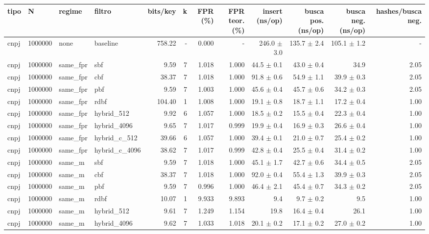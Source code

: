 \begin{tabular}{llllrrrrrrrr}
\toprule
tipo & N & regime & filtro & bits/key & k & FPR (\%) & FPR teor. (\%) & insert (ns/op) & busca pos. (ns/op) & busca neg. (ns/op) & hashes/busca neg. \\
\midrule
cnpj & 1000000 & none & baseline & 758.22 & - & 0.000 & - & 246.0 $\pm$ 3.0 & 135.7 $\pm$ 2.4 & 105.1 $\pm$ 1.2 & - \\
cnpj & 1000000 & same\_fpr & sbf & 9.59 & 7 & 1.018 & 1.000 & 44.5 $\pm$ 0.1 & 43.0 $\pm$ 0.4 & 34.9 & 2.05 \\
cnpj & 1000000 & same\_fpr & cbf & 38.37 & 7 & 1.018 & 1.000 & 91.8 $\pm$ 0.6 & 54.9 $\pm$ 1.1 & 39.9 $\pm$ 0.3 & 2.05 \\
cnpj & 1000000 & same\_fpr & pbf & 9.59 & 7 & 1.003 & 1.000 & 45.6 $\pm$ 0.4 & 45.7 $\pm$ 0.6 & 34.2 $\pm$ 0.3 & 2.05 \\
cnpj & 1000000 & same\_fpr & rdbf & 104.40 & 1 & 1.008 & 1.000 & 19.1 $\pm$ 0.8 & 18.7 $\pm$ 1.1 & 17.2 $\pm$ 0.4 & 1.00 \\
cnpj & 1000000 & same\_fpr & hybrid\_512 & 9.92 & 6 & 1.057 & 1.000 & 18.5 $\pm$ 0.2 & 15.5 $\pm$ 0.4 & 22.3 $\pm$ 0.4 & 1.00 \\
cnpj & 1000000 & same\_fpr & hybrid\_4096 & 9.65 & 7 & 1.017 & 0.999 & 19.9 $\pm$ 0.4 & 16.9 $\pm$ 0.3 & 26.6 $\pm$ 0.4 & 1.00 \\
cnpj & 1000000 & same\_fpr & hybrid\_c\_512 & 39.66 & 6 & 1.057 & 1.000 & 39.4 $\pm$ 0.1 & 21.0 $\pm$ 0.7 & 25.4 $\pm$ 0.2 & 1.00 \\
cnpj & 1000000 & same\_fpr & hybrid\_c\_4096 & 38.62 & 7 & 1.017 & 0.999 & 42.8 $\pm$ 0.4 & 25.5 $\pm$ 0.4 & 31.4 $\pm$ 0.2 & 1.00 \\
cnpj & 1000000 & same\_m & sbf & 9.59 & 7 & 1.018 & 1.000 & 45.1 $\pm$ 1.7 & 42.7 $\pm$ 0.6 & 34.4 $\pm$ 0.5 & 2.05 \\
cnpj & 1000000 & same\_m & cbf & 38.37 & 7 & 1.018 & 1.000 & 92.0 $\pm$ 0.4 & 55.4 $\pm$ 1.3 & 39.9 $\pm$ 0.3 & 2.05 \\
cnpj & 1000000 & same\_m & pbf & 9.59 & 7 & 0.996 & 1.000 & 46.4 $\pm$ 2.1 & 45.4 $\pm$ 0.7 & 34.3 $\pm$ 0.2 & 2.05 \\
cnpj & 1000000 & same\_m & rdbf & 10.07 & 1 & 9.933 & 9.893 & 9.4 & 9.7 $\pm$ 0.2 & 9.5 & 1.00 \\
cnpj & 1000000 & same\_m & hybrid\_512 & 9.61 & 7 & 1.249 & 1.154 & 19.8 & 16.4 $\pm$ 0.4 & 26.1 & 1.00 \\
cnpj & 1000000 & same\_m & hybrid\_4096 & 9.62 & 7 & 1.033 & 1.018 & 20.1 $\pm$ 0.2 & 17.1 $\pm$ 0.2 & 27.0 $\pm$ 0.2 & 1.00 \\

\end{tabular}

